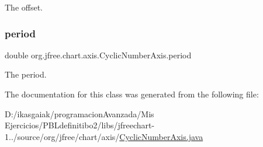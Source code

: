 The offset. \mbox{\label{classorg_1_1jfree_1_1chart_1_1axis_1_1_cyclic_number_axis_a3c65906e3e4963a1cf1f9ade9237ea7c}} 
\subsubsection{\texorpdfstring{period}{period}}
{\footnotesize\ttfamily double org.\+jfree.\+chart.\+axis.\+Cyclic\+Number\+Axis.\+period\hspace{0.3cm}{\ttfamily [protected]}}

The period. 

The documentation for this class was generated from the following file\+:\begin{DoxyCompactItemize}
\item 
D\+:/ikasgaiak/programacion\+Avanzada/\+Mis Ejercicios/\+P\+B\+Ldefinitibo2/libs/jfreechart-\/1../source/org/jfree/chart/axis/\mbox{\hyperlink{_cyclic_number_axis_8java}{Cyclic\+Number\+Axis.\+java}}\end{DoxyCompactItemize}
